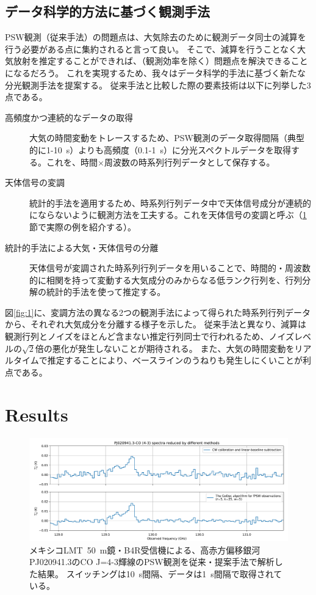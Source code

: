 \documentclass[a4paper,10pt,oneside,twocolumn,notitlepage,final]{jarticle}
\begin{document}
\subsection{データ科学的方法に基づく観測手法}

PSW観測（従来手法）の問題点は、大気除去のために観測データ同士の減算を行う必要がある点に集約されると言って良い。
そこで、減算を行うことなく大気放射を推定することができれば、（観測効率を除く）問題点を解決できることになるだろう。
これを実現するため、我々はデータ科学的手法に基づく新たな分光観測手法を提案する。
従来手法と比較した際の要素技術は以下に列挙した3点である。

\begin{description}
    \item[高頻度かつ連続的なデータの取得] 大気の時間変動をトレースするため、PSW観測のデータ取得間隔（典型的に1-10~s）よりも高頻度（0.1-1~s）に分光スペクトルデータを取得する。これを、時間$\times$周波数の時系列行列データとして保存する。
    \item[天体信号の変調] 統計的手法を適用するため、時系列行列データ中で天体信号成分が連続的にならないように観測方法を工夫する。これを天体信号の変調と呼ぶ（\ref{s:results}節で実際の例を紹介する）。
    \item[統計的手法による大気・天体信号の分離] 天体信号が変調された時系列行列データを用いることで、時間的・周波数的に相関を持って変動する大気成分のみからなる低ランク行列を、行列分解の統計的手法を使って推定する。
\end{description}

図\ref{fig:1}に、変調方法の異なる2つの観測手法によって得られた時系列行列データから、それぞれ大気成分を分離する様子を示した。
従来手法と異なり、減算は観測行列とノイズをほとんど含まない推定行列同士で行われるため、ノイズレベルの$\sqrt{2}$倍の悪化が発生しないことが期待される。
また、大気の時間変動をリアルタイムで推定することにより、ベースラインのうねりも発生しにくいことが利点である。

\section{Results}
\label{s:results}


\begin{figure}[t]
    \centering
    \includegraphics[width=\textwidth]{figures/figure-3}
    \caption{
        メキシコLMT~50~m鏡・B4R受信機による、高赤方偏移銀河PJ020941.3のCO J=4-3輝線のPSW観測を従来・提案手法で解析した結果。
        スイッチングは10~s間隔、データは1~s間隔で取得されている。
    }
    \label{fig:3}
\end{figure}
\end{document}
